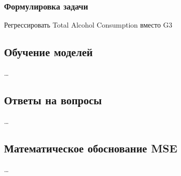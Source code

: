 \subsubsection{Формулировка задачи}

Регрессировать Total Alcohol Consumption вместо G3

\subsection{Обучение моделей}

\dots

\subsection{Ответы на вопросы}

\dots

\subsection{Математическое обоснование MSE}

\dots